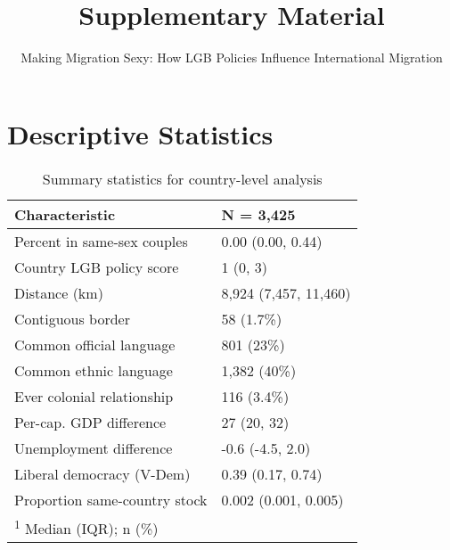 \documentclass[
  11pt,
]{article}
\title{Supplementary Material}
\subtitle{Making Migration Sexy: How LGB Policies Influence International Migration}
\author{}
\date{\vspace{-2.5em}}
\begin{document}
\maketitle

{
\hypersetup{linkcolor=}
\setcounter{tocdepth}{2}
\tableofcontents
}
\hypertarget{appendix-appendix}{%
\appendix}


\hypertarget{descriptive-statistics}{%
\section{Descriptive Statistics}\label{descriptive-statistics}}

\begin{table}[!h]

\caption{\label{tab:desc-table-country}Summary statistics for country-level analysis}
\centering
\fontsize{8}{10}\selectfont
\begin{tabular}[t]{ll}
\toprule
Characteristic & N = 3,425\\
\midrule
Percent in same-sex couples & 0.00 (0.00, 0.44)\\
Country LGB policy score & 1 (0, 3)\\
Distance (km) & 8,924 (7,457, 11,460)\\
Contiguous border & 58 (1.7\%)\\
Common official language & 801 (23\%)\\
\addlinespace
Common ethnic language & 1,382 (40\%)\\
Ever colonial relationship & 116 (3.4\%)\\
Per-cap. GDP difference & 27 (20, 32)\\
Unemployment difference & -0.6 (-4.5, 2.0)\\
Liberal democracy (V-Dem) & 0.39 (0.17, 0.74)\\
\addlinespace
Proportion same-country stock & 0.002 (0.001, 0.005)\\
\bottomrule
\multicolumn{2}{l}{\rule{0pt}{1em}\textsuperscript{1} Median (IQR); n (\%)}\\
\end{tabular}
\end{table}
\end{document}
